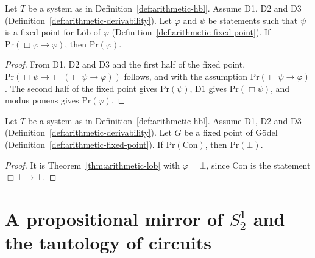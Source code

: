 \begin{theorem}
  \label{thm:arithmetic-lob}
  \leanok
  Let $T$ be a system as in Definition~\ref{def:arithmetic-hbl}. Assume D1, D2 and D3
  (Definition~\ref{def:arithmetic-derivability}). Let $\varphi$ and $\psi$ be statements such that $\psi$
  is a fixed point for L\"ob of $\varphi$ (Definition~\ref{def:arithmetic-fixed-point}). If
  $\mathrm{Pr}(\Box\varphi \to \varphi)$, then $\mathrm{Pr}(\varphi)$.
\end{theorem}

\begin{proof}
  \leanok
  From D1, D2 and D3 and the first half of the fixed point, $\mathrm{Pr}(\Box\psi \to \Box(\Box\psi
  \to \varphi))$ follows, and with the assumption $\mathrm{Pr}(\Box\psi \to \varphi)$. The second
  half of the fixed point gives $\mathrm{Pr}(\psi)$, D1 gives $\mathrm{Pr}(\Box\psi)$, and modus ponens
  gives $\mathrm{Pr}(\varphi)$.
\end{proof}

\begin{theorem}
  \label{thm:arithmetic-godel2}
  \leanok
  Let $T$ be a system as in Definition~\ref{def:arithmetic-hbl}. Assume D1, D2 and D3
  (Definition~\ref{def:arithmetic-derivability}). Let $G$ be a fixed point of G\"odel
  (Definition~\ref{def:arithmetic-fixed-point}). If $\mathrm{Pr}(\mathrm{Con})$, then
  $\mathrm{Pr}(\bot)$.
\end{theorem}

\begin{proof}
  \leanok
  It is Theorem~\ref{thm:arithmetic-lob} with $\varphi = \bot$, since $\mathrm{Con}$ is the statement
  $\Box\bot \to \bot$.
\end{proof}

\section{A propositional mirror of $S^1_2$ and the tautology of circuits}
\label{sec:arithmetic-mirror}

